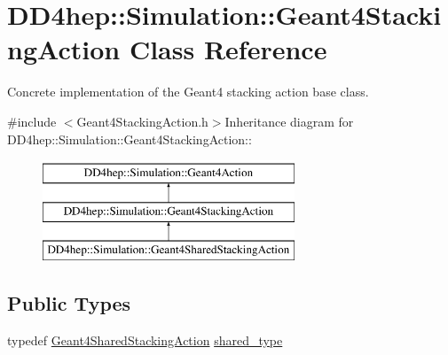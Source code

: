 \hypertarget{class_d_d4hep_1_1_simulation_1_1_geant4_stacking_action}{
\section{DD4hep::Simulation::Geant4StackingAction Class Reference}
\label{class_d_d4hep_1_1_simulation_1_1_geant4_stacking_action}
}


Concrete implementation of the Geant4 stacking action base class.  


{\ttfamily \#include $<$Geant4StackingAction.h$>$}Inheritance diagram for DD4hep::Simulation::Geant4StackingAction::\begin{figure}[H]
\begin{center}
\leavevmode
\includegraphics[height=3cm]{class_d_d4hep_1_1_simulation_1_1_geant4_stacking_action}
\end{center}
\end{figure}
\subsection*{Public Types}
\begin{DoxyCompactItemize}
\item 
typedef \hyperlink{class_d_d4hep_1_1_simulation_1_1_geant4_shared_stacking_action}{Geant4SharedStackingAction} \hyperlink{class_d_d4hep_1_1_simulation_1_1_geant4_stacking_action_a7cb1de3eaba3df79df86318e664968e4}{shared\_\-type}
\end{DoxyCompactItemize}
